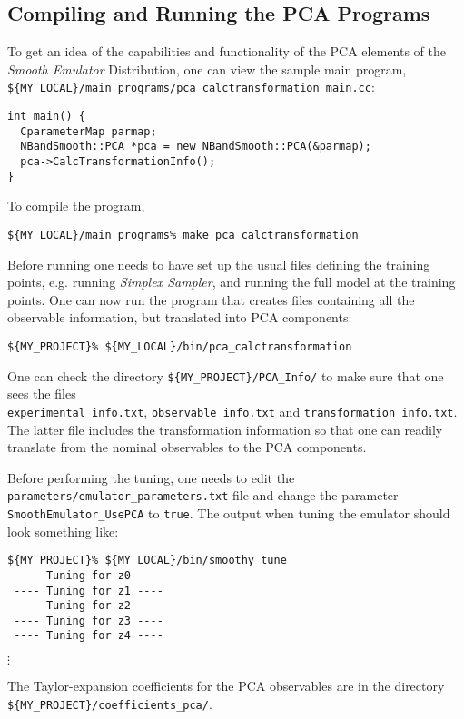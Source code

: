 \documentclass[UserManual.tex]{subfiles}
\begin{document}
\subsection{Compiling and Running the PCA Programs}
To get an idea of the capabilities and functionality of the PCA elements of the {\it Smooth Emulator} Distribution, one can view the sample main program,\\
{\tt \$\{MY\_LOCAL\}/main\_programs/pca\_calctransformation\_main.cc}:
{\tt\begin{verbatim}
int main() {
  CparameterMap parmap;
  NBandSmooth::PCA *pca = new NBandSmooth::PCA(&parmap);
  pca->CalcTransformationInfo();
}
\end{verbatim}}
To compile the program,
{\tt\begin{verbatim}
${MY_LOCAL}/main_programs% make pca_calctransformation
\end{verbatim}}
Before running one needs to have set up the usual files defining the training points, e.g. running {\it Simplex Sampler}, and running the full model at the training points. One can now run the program that creates files containing all the observable information, but translated into PCA components:
{\tt\begin{verbatim}
${MY_PROJECT}% ${MY_LOCAL}/bin/pca_calctransformation
\end{verbatim}}
One can check the directory {\tt \$\{MY\_PROJECT\}/PCA\_Info/} to make sure that one sees the files\\{\tt experimental\_info.txt}, {\tt observable\_info.txt} and {\tt transformation\_info.txt}. The latter file includes the transformation information so that one can readily translate from the nominal observables to the PCA components.

Before performing the tuning, one needs to edit the {\tt parameters/emulator\_parameters.txt} file and change the parameter {\tt SmoothEmulator\_UsePCA} to {\tt true}. The output when tuning the emulator should look something like:
{\tt\begin{verbatim}
${MY_PROJECT}% ${MY_LOCAL}/bin/smoothy_tune
 ---- Tuning for z0 ----
 ---- Tuning for z1 ----
 ---- Tuning for z2 ----
 ---- Tuning for z3 ----
 ---- Tuning for z4 ----
\end{verbatim}} \vspace*{-16pt}
\hspace*{35pt}$\vdots$

The Taylor-expansion coefficients for the PCA observables are in the directory {\tt \$\{MY\_PROJECT\}/coefficients\_pca/}. 
\end{document}
